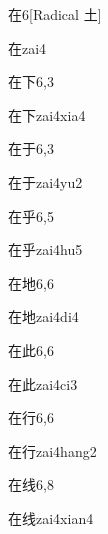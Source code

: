 \begin{entry}{在}{6}[Radical 土]
  \begin{phonetics}{在}{zai4}
  \end{phonetics}
\end{entry}

\begin{entry}{在下}{6,3}
  \begin{phonetics}{在下}{zai4xia4}
  \end{phonetics}
\end{entry}

\begin{entry}{在于}{6,3}
  \begin{phonetics}{在于}{zai4yu2}
  \end{phonetics}
\end{entry}

\begin{entry}{在乎}{6,5}
  \begin{phonetics}{在乎}{zai4hu5}
  \end{phonetics}
\end{entry}

\begin{entry}{在地}{6,6}
  \begin{phonetics}{在地}{zai4di4}
  \end{phonetics}
\end{entry}

\begin{entry}{在此}{6,6}
  \begin{phonetics}{在此}{zai4ci3}
  \end{phonetics}
\end{entry}

\begin{entry}{在行}{6,6}
  \begin{phonetics}{在行}{zai4hang2}
  \end{phonetics}
\end{entry}

\begin{entry}{在线}{6,8}
  \begin{phonetics}{在线}{zai4xian4}
  \end{phonetics}
\end{entry}

